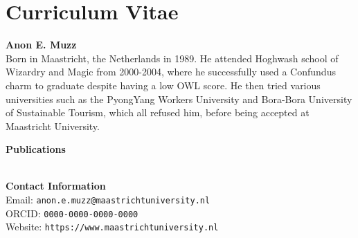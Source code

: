 
\chapter*{Curriculum Vitae}

\noindent
\textbf{Anon E. Muzz}\\
Born in Maastricht, the Netherlands in 1989. He attended Hoghwash school of Wizardry and Magic from 2000-2004, where he successfully used a Confundus charm to graduate despite having a low OWL score. He then tried various universities such as the PyongYang Workers University and Bora-Bora University of Sustainable Tourism, which all refused him, before being accepted at Maastricht University. 

\bigskip

\noindent
\textbf{Publications}\\
\\

\bigskip

\noindent
\textbf{Contact Information}\\
Email: \texttt{anon.e.muzz@maastrichtuniversity.nl}\\
ORCID: \texttt{0000-0000-0000-0000}\\
Website: \texttt{https://www.maastrichtuniversity.nl}